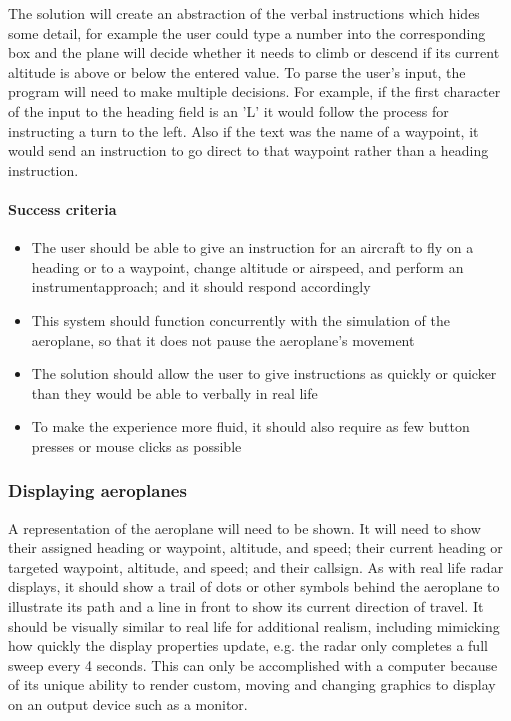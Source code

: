 \documentclass{article}
\begin{document}
The solution will create an abstraction of the verbal instructions which hides some detail, for example the user could type a number into the corresponding box and the plane will decide whether it needs to climb or descend if its current altitude is above or below the entered value.
To parse the user's input, the program will need to make multiple decisions.
For example, if the first character of the input to the heading field is an 'L' it would follow the process for instructing a turn to the left.
Also if the text was the name of a waypoint, it would send an instruction to go direct to that waypoint rather than a heading instruction.

\paragraph{Success criteria}
\begin{itemize}
    \item The user should be able to give an instruction for an aircraft to fly on a \gls{heading} or to a \gls{waypoint}, change altitude or \gls{airspeed}, and perform an \gls{instrumentapproach}; and it should respond accordingly
    \item This system should function concurrently with the simulation of the aeroplane, so that it does not pause the aeroplane's movement
    \item The solution should allow the user to give instructions as quickly or quicker than they would be able to verbally in real life
    \item To make the experience more fluid, it should also require as few button presses or mouse clicks as possible
\end{itemize}

\subsubsection{Displaying aeroplanes}
A representation of the aeroplane will need to be shown.
It will need to show their assigned heading or waypoint, altitude, and speed; their current heading or targeted waypoint, altitude, and speed; and their callsign.
As with real life radar displays, it should show a trail of dots or other symbols behind the aeroplane to illustrate its path and a line in front to show its current direction of travel.
It should be visually similar to real life for additional realism, including mimicking how quickly the display properties update, e.g. the radar only completes a full sweep every 4 seconds.
This can only be accomplished with a computer because of its unique ability to render custom, moving and changing graphics to display on an output device such as a monitor.
\end{document}
